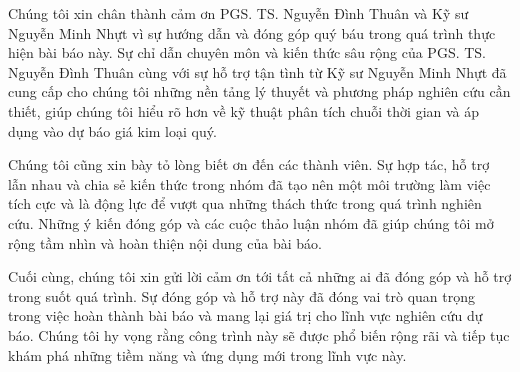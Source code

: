
Chúng tôi xin chân thành cảm ơn PGS. TS. Nguyễn Đình Thuân và Kỹ sư Nguyễn Minh Nhựt vì sự hướng dẫn và đóng góp quý báu trong quá trình thực hiện bài báo này. Sự chỉ dẫn chuyên môn và kiến thức sâu rộng của PGS. TS. Nguyễn Đình Thuân cùng với sự hỗ trợ tận tình từ Kỹ sư Nguyễn Minh Nhựt đã cung cấp cho chúng tôi những nền tảng lý thuyết và phương pháp nghiên cứu cần thiết, giúp chúng tôi hiểu rõ hơn về kỹ thuật phân tích chuỗi thời gian và áp dụng vào dự báo giá kim loại quý.

Chúng tôi cũng xin bày tỏ lòng biết ơn đến các thành viên. Sự hợp tác, hỗ trợ lẫn nhau và chia sẻ kiến thức trong nhóm đã tạo nên một môi trường làm việc tích cực và là động lực để vượt qua những thách thức trong quá trình nghiên cứu. Những ý kiến đóng góp và các cuộc thảo luận nhóm đã giúp chúng tôi mở rộng tầm nhìn và hoàn thiện nội dung của bài báo.

Cuối cùng, chúng tôi xin gửi lời cảm ơn tới tất cả những ai đã đóng góp và hỗ trợ trong suốt quá trình. Sự đóng góp và hỗ trợ này đã đóng vai trò quan trọng trong việc hoàn thành bài báo và mang lại giá trị cho lĩnh vực nghiên cứu dự báo. Chúng tôi hy vọng rằng công trình này sẽ được phổ biến rộng rãi và tiếp tục khám phá những tiềm năng và ứng dụng mới trong lĩnh vực này.